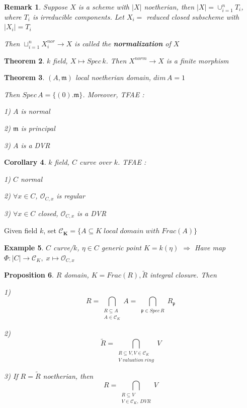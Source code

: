 \documentclass{article}
\newtheorem{theorem}{Theorem}[section]
\newtheorem{corollary}[theorem]{Corollary}
\newtheorem{example}[theorem]{Example}
\newtheorem{proposition}[theorem]{Proposition}
\newtheorem{remark}[theorem]{Remark}
\begin{document}
\begin{remark}
    Suppose $X$ is a scheme with $|X|$ noetherian, then $|X|=\cup_{i=1}^nT_i$, where $T_i$ is irreducible components. Let $X_i=$ reduced closed subscheme with $|X_i|=T_i$

    Then $\sqcup_{i=1}^n X_i^{nor} \to X$ is called the \textbf{normalization} of $X$
\end{remark}

\begin{theorem}
    $k$ field, $X \mapsto Spec\,k$. Then $X^{norm} \to X$ is a finite morphism
\end{theorem}

\begin{theorem}
    $(A,\mathfrak m)$ local noetherian domain, $dim\,A=1$
    
    Then $Spec\,A=\{(0).\mathfrak m\}$. Moreover, TFAE :

    1) $A$ is normal

    2) $\mathfrak m$ is principal

    3) $A$ is a DVR
\end{theorem}

\begin{corollary}
    $k$ field, $C$ curve over $k$. TFAE :

    1) $C$ normal

    2) $\forall x\in C$, $\mathcal O_{C,x}$ is regular

    3) $\forall x\in C$ closed, $\mathcal O_{C,x}$ is a DVR
\end{corollary}

Given field $k$, set $\bm{\mathcal C_K}=\{A\subseteq K\; local\;domain\; with\; Frac(A)\}$

\begin{example}
    $C$ curve/$k$, $\eta\in C$ generic point $K=k(\eta)$ $\Rightarrow$ Have map $\Phi:|C| \to \mathcal C_K, \; x\mapsto \mathcal O_{C,x}$
\end{example}

\begin{proposition}
    $R$ domain, $K=Frac(R),\widetilde R$ integral closure. Then

1)
$$
R=\bigcap_{\substack{R\subseteq A\\[3pt]A\in \mathcal C_K}}A
=\bigcap_{\substack{\mathfrak p\in Spec\,R}}R_{\mathfrak p}
$$

2)
$$
\widetilde R=\bigcap_{\substack{R\subseteq V,V\in\mathcal C_K\\[3pt]V\;valuation\;ring}}V
$$

3) If $R=\widetilde R$ noetherian, then
$$
R=\bigcap_{\substack{R\subseteq V\\[3pt]V\in \mathcal C_K,\, DVR}}V
$$
\end{proposition}
\end{document}
